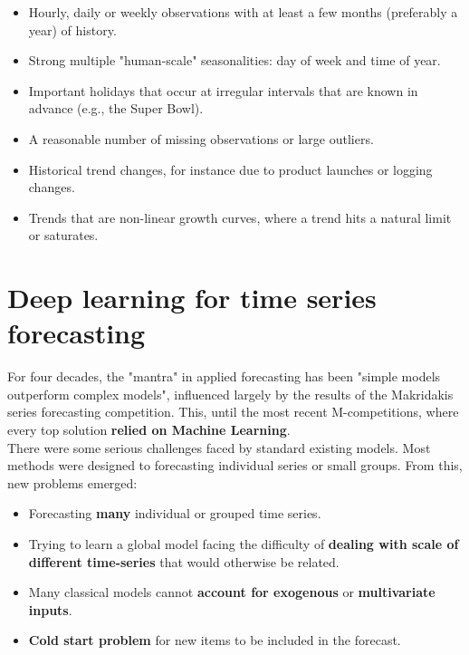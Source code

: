 \begin{itemize}
    \item Hourly, daily or weekly observations with at least a few months (preferably a year)
    of history.

    \item Strong multiple "human-scale" seasonalities: day of week and time of year.
    
    \item Important holidays that occur at irregular intervals that are known in advance
    (e.g., the Super Bowl).

    \item A reasonable number of missing observations or large outliers.
    
    \item Historical trend changes, for instance due to product launches or logging changes.
    
    \item Trends that are non-linear growth curves, where a trend hits a natural limit or
    saturates.
\end{itemize}

\section{Deep learning for time series forecasting}

For four decades, the "mantra" in applied forecasting has been "simple models outperform
complex models", influenced largely by the results of the Makridakis series forecasting
competition. This, until the most recent M-competitions, where every top solution
\textbf{relied on Machine Learning}.\\

There were some serious challenges faced by standard existing models. Most methods were
designed to forecasting individual series or small groups. From this, new problems emerged:
\begin{itemize}
    \item Forecasting \textbf{many} individual or grouped time series.
    
    \item Trying to learn a global model facing the difficulty of \textbf{dealing 
    with scale of different time-series} that would otherwise be related.
    
    \item Many classical models cannot \textbf{account for exogenous} or \textbf{multivariate
    inputs}.

    \item \textbf{Cold start problem} for new items to be included in the forecast.
\end{itemize}

